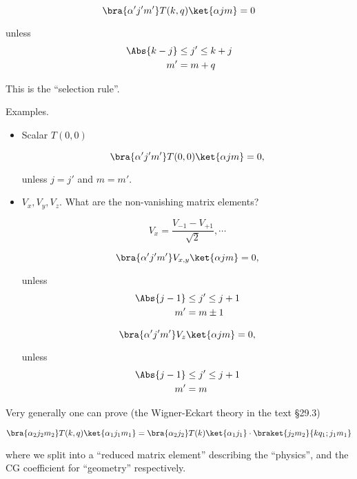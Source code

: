 \begin{equation}\label{eqn:qmTwoL20:150}
\bra{\alpha' j' m'} T(k, q) \ket{\alpha j m} = 0 
\end{equation}

unless 
\begin{align}\label{eqn:qmTwoL20:170}
\Abs{k - j} &\le j' \le k + j \\
m' &= m + q
\end{align}

This is the ``selection rule''.

Examples.

\begin{itemize}
\item Scalar $T(0, 0)$

\begin{equation}\label{eqn:qmTwoL20:190}
\bra{\alpha' j' m'} T(0, 0) \ket{\alpha j m} = 0 ,
\end{equation}

unless $j = j'$ and $m = m'$.

\item $V_x, V_y, V_z$.  What are the non-vanishing matrix elements?

\begin{equation}\label{eqn:qmTwoL20:210}
V_x = \frac{ V_{-1} - V_{+1}}{\sqrt{2}}, \cdots
\end{equation}

\begin{equation}\label{eqn:qmTwoL20:230}
\bra{\alpha' j' m'} V_{x, y} \ket{\alpha j m} = 0 ,
\end{equation}

unless
\begin{align}\label{eqn:qmTwoL20:250}
\Abs{j - 1} &\le j' \le j + 1  \\
m' &= m \pm 1
\end{align}

\begin{equation}\label{eqn:qmTwoL20:270}
\bra{\alpha' j' m'} V_{z} \ket{\alpha j m} = 0 ,
\end{equation}

unless
\begin{align}\label{eqn:qmTwoL20:290}
\Abs{j - 1} &\le j' \le j + 1  \\
m' &= m  
\end{align}
\end{itemize}

Very generally one can prove (the Wigner-Eckart theory in the text \S 29.3)

\begin{equation}\label{eqn:qmTwoL20:310}
\bra{\alpha_2 j_2 m_2} T(k, q) \ket{\alpha_1 j_1 m_1}
=
\bra{\alpha_2 j_2 } T(k) \ket{\alpha_1 j_1} \cdot
\braket{j_2 m_2}{k q_1 ; j_1 m_1} 
\end{equation}

where we split into a ``reduced matrix element'' describing the ``physics'', and the CG coefficient for ``geometry'' respectively.

\EndArticle
